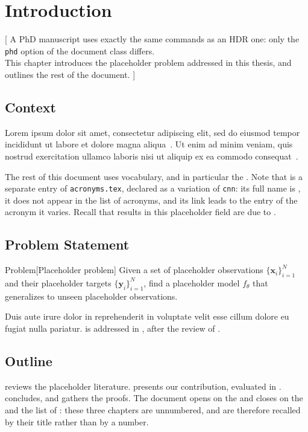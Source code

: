 \chapter[phd_introduction]{Introduction}
 [
  A PhD manuscript uses exactly the same commands as an HDR one: only the \texttt{phd} option of the document class differs. \\
  This chapter introduces the placeholder problem addressed in this thesis, and outlines the rest of the document.
 ]

\section[phd_context]{Context}

Lorem ipsum dolor sit amet, consectetur adipiscing elit, sed do eiusmod tempor incididunt ut labore et dolore magna aliqua~\cite{ipsum1998foundational}.
Ut enim ad minim veniam, quis nostrud exercitation ullamco laboris nisi ut aliquip ex ea commodo consequat~\cite{tempor2009textbook}.

The rest of this document uses  vocabulary, and in particular the .
Note that  is a separate entry of \verb|acronyms.tex|, declared as a variation of \verb|cnn|: its full name is , it does not appear in the list of acronyms, and its link leads to the entry of the acronym it varies.
Recall that  results in this placeholder field are due to \cite{amet2017seminal}.

\section[phd_problem]{Problem Statement}

\begin{boxenv}{Problem}[Placeholder problem]
    Given a set of placeholder observations $\{\bm{x}_i\}_{i = 1}^N$ and their placeholder targets $\{\bm{y}_i\}_{i = 1}^N$, find a placeholder model $f_\theta$ that generalizes to unseen placeholder observations.
\end{boxenv}

Duis aute irure dolor in reprehenderit in voluptate velit esse cillum dolore eu fugiat nulla pariatur.
 is addressed in , after the review of .

\section[phd_outline]{Outline}

 reviews the placeholder literature.
 presents our contribution, evaluated in .
 concludes, and  gathers the proofs.
The document opens on the  and closes on the  and the list of : these three chapters are unnumbered, and are therefore recalled by their title rather than by a number.
